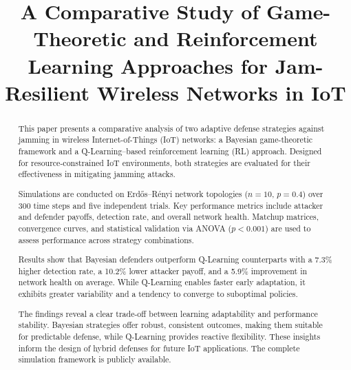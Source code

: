 \documentclass[conference]{IEEEtran}
\begin{document}

\title{A Comparative Study of Game-Theoretic and Reinforcement Learning Approaches for Jam-Resilient Wireless Networks in IoT}

\author{
  \and
  \and
}

\maketitle

\begin{abstract}
This paper presents a comparative analysis of two adaptive defense strategies against jamming in wireless Internet-of-Things (IoT) networks: a Bayesian game-theoretic framework and a Q-Learning–based reinforcement learning (RL) approach. Designed for resource-constrained IoT environments, both strategies are evaluated for their effectiveness in mitigating jamming attacks.

Simulations are conducted on Erd\H{o}s–R\'enyi network topologies ($n = 10$, $p = 0.4$) over 300 time steps and five independent trials. Key performance metrics include attacker and defender payoffs, detection rate, and overall network health. Matchup matrices, convergence curves, and statistical validation via ANOVA ($p < 0.001$) are used to assess performance across strategy combinations.

Results show that Bayesian defenders outperform Q-Learning counterparts with a 7.3\% higher detection rate, a 10.2\% lower attacker payoff, and a 5.9\% improvement in network health on average. While Q-Learning enables faster early adaptation, it exhibits greater variability and a tendency to converge to suboptimal policies.

The findings reveal a clear trade-off between learning adaptability and performance stability. Bayesian strategies offer robust, consistent outcomes, making them suitable for predictable defense, while Q-Learning provides reactive flexibility. These insights inform the design of hybrid defenses for future IoT applications. The complete simulation framework is publicly available.
\end{abstract}
\end{document}
